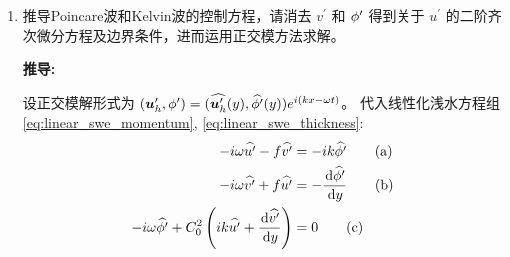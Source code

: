 \begin{enumerate}
    设正交模解形式为 $\streamfunc^\prime = \complexamp{\streamfunc^\prime} \complexexp{(\kvec_h \cdot \pos_h - \frequency \timevar)}$，代入方程:
    \begin{equation*}
        (-i\frequency)(-(k^2 + l^2)) + \hvel_0 (ik)(-(k^2 + l^2)) + \rossby_0 (ik) = 0
    \end{equation*}

    频散关系为:
    \begin{equation*}
        \frequency = \hvel_0 k - \frac{\rossby_0 k}{k^2 + l^2}
    \end{equation*}

    纬向和经向波速为:
    \begin{equation*}
        c_x = \frac{\frequency}{k} = \hvel_0 - \frac{\rossby_0}{k^2 + l^2}, \quad c_y = \frac{\frequency}{l} = \frac{k}{l} c_x
    \end{equation*}

    驻波条件为 $c_x = 0$，要求:
    \begin{equation*}
        \hvel_0 = \frac{\rossby_0}{k^2 + l^2} = \frac{\rossby_0}{4\pi^2} \frac{\lambda_x^2 \lambda_y^2}{\lambda_x^2 + \lambda_y^2}
    \end{equation*}

    临界波长条件:
    \begin{equation*}
        \frac{1}{\lambda_x^2} + \frac{1}{\lambda_y^2} = \frac{\rossby_0}{4\pi^2 \hvel_0}
    \end{equation*}

    特别地，若不考虑经向Rossby波，即 $l = 0$，临界波长条件为:
    \begin{equation*}
        \lambda_x = 2\pi\sqrt{\frac{\hvel_0}{\rossby_0}}
    \end{equation*}

    \item 推导Poincare波和Kelvin波的控制方程，请消去 $v^\prime$ 和 $\phi^\prime$ 得到关于 $u^\prime$ 的二阶齐次微分方程及边界条件，进而运用正交模方法求解。

    \vspace{1em}
    \textbf{推导:}

    设正交模解形式为 $(\bm{u}_h^\prime, \phi^\prime) = (\widehat{\bm{u}_h^\prime}(y), \widehat{\phi^\prime}(y)) e^{i (k x - \omega t)}$。
    代入线性化浅水方程组 \eqref{eq:linear_swe_momentum}, \eqref{eq:linear_swe_thickness}:
    \begin{align*}
        -i \frequency \complexamp{u^\prime} - \coriolis \complexamp{v^\prime} &= -i k\complexamp{\gravpotential^\prime} \tag{a} \\
        -i \frequency \complexamp{v^\prime} + \coriolis \complexamp{u^\prime} &= -\ode{\complexamp{\gravpotential^\prime}}{y} \tag{b} \\
        -i \frequency \complexamp{\gravpotential^\prime} + C_0^2 \left(ik\complexamp{u^\prime} + \ode{\complexamp{v^\prime}}{y}\right) &= 0 \tag{c}
    \end{align*}


\end{enumerate}
